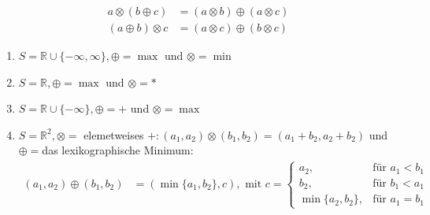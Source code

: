 \documentclass[ngerman,a4paper]{report}
\begin{document}
\begin{align*}
a \otimes (b \oplus c) &= (a \otimes b) \oplus (a \otimes c)\\
(a \oplus b) \otimes c &= (a \otimes c) \oplus (b \otimes c)
\end{align*}

\begin{enumerate}
\item $S=\mathbb{R} \cup \{-\infty,\infty \}, \oplus = \max$ und $\otimes = \min$
\item $S=\mathbb{R}, \oplus = \max$ und $\otimes = *$
\item $S=\mathbb{R} \cup \{-\infty\}, \oplus = +$ und $\otimes = \max$
\item $S=\mathbb{R}^2, \otimes=$ elemetweises $+: (a_1,a_2)\otimes(b_1,b_2) = (a_1+b_2,a_2+b_2)$ und $\oplus=$das lexikographische Minimum:
\begin{align*}
(a_1,a_2)\oplus (b_1,b_2) &= (\min\{a_1,b_2\},c), \text{ mit } c = \begin{cases} a_2, &\text{für }a_1 < b_1 \\ b_2, &\text{für }b_1 < a_1 \\ \min\{a_2,b_2\},&\text{für } a_1=b_1\end{cases}
\end{align*}
\end{enumerate}
\end{document}
